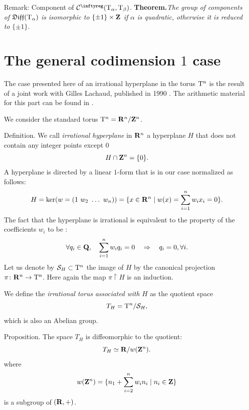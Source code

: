 \begin{Article}{Remark: Component of $\Cinfty(\Torus_\alpha,\Torus_\beta)$.}{}
  \textbf{Theorem.}{\itshape The group of components of $\mathfrak{Diff}(\mathrm{T}_\alpha)$ is isomorphic to $\{\pm 1\} \times \mathbf{Z}$ if $\alpha$ is quadratic,
  otherwise it is reduced to $\{\pm 1\}$.
  }
\end{Article}

\section{The general codimension $1$ case}

The case presented here of an irrational hyperplane in the torus $\mathrm{T}^n$ is the result of a joint work with Gilles Lachaud,
published in 1990 \cite{IL90}. The arithmetic material for this part can be found in \cite{BC67}.

We consider the standard torus $\mathrm{T}^n = \mathbf{R}^n/\mathbf{Z}^n$.

\begin{Article}{Definition.}{\itshape}
  We call \emph{irrational hyperplane} in $\mathbf{R}^n$ a hyperplane $H$ that does not contain any integer points except $0$
  $$%
    H \cap \ZZ^n = \{0\}.
    $$%
  A hyperplane is directed by a linear $1$-form that is in our case normalized as follows:
  $$%
    H = \ker (w = (1\ w_2\ \dots\ w_n)) = \{x \in \RR^n \mid w(x) = \sum_{i=1}^n w_i x_i = 0 \}.
    $$%
  The fact that the hyperplane is irrational is equivalent to the property of the coefficients $w_i$ to be :
  $$%
    \forall q_i \in \QQ, \quad \sum_{i = 1}^n w_i q_i = 0 \quad \Rightarrow \quad q_i = 0, \forall i.
    $$%
  Let us denote by $\mathcal{S}_H \subset \mathrm{T}^n$ the image of $H$ by the canonical projection $\pi \colon \mathbf{R}^n \to \mathrm{T}^n$.
  Here again the map $\pi \restriction H$ is an induction.
  
  We define the \emph{irrational torus associated with $H$} as the quotient space
  $$%
    T_H = \Torus^n/\cS_H,
    $$%
  which is also an Abelian group.
\end{Article}

\begin{Article}{Proposition.}{\itshape}
  The space $T_H$ is diffeomorphic to the quotient:
  $$%
    T_H \simeq \RR/w(\ZZ^n).
    $$%
  where
  $$%
    w(\ZZ^n) = \{n_1 + \sum_{i=2}^n w_i n_i \mid n_i \in \ZZ \}
    $$%
  is a subgroup of $(\mathbf{R},+)$.
\end{Article}

